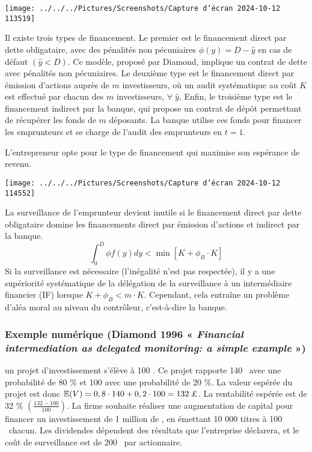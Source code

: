 \documentclass[a4paper, 12pt]{report}
\begin{document}
\texttt{[image: ../../../Pictures/Screenshots/Capture d'écran 2024-10-12 113519]}

Il existe trois types de financement. Le premier est le financement direct par dette obligataire, avec des pénalités non pécuniaires $\phi(y)=D-\widehat{y}$ en cas de défaut $(\widehat{y} < D)$. Ce modèle, proposé par Diamond, implique un contrat de dette avec pénalités non pécuniaires. Le deuxième type est le financement direct par émission d’actions auprès de $m$ investisseurs, où un audit systématique au coût $K$ est effectué par chacun des $m$ investisseurs, $\forall\;\widehat{y}$. Enfin, le troisième type est le financement indirect par la banque, qui propose un contrat de dépôt permettant de récupérer les fonds de $m$ déposants. La banque utilise ces fonds pour financer les emprunteurs et se charge de l’audit des emprunteurs en $t=1$. 

L'entrepreneur opte pour le type de financement qui maximise son espérance de revenu.
\begin{center}
	\texttt{[image: ../../../Pictures/Screenshots/Capture d'écran 2024-10-12 114552]}
\end{center}

La surveillance de l’emprunteur devient inutile si le financement direct par dette obligataire domine les financements direct par émission d’actions et indirect par la banque.
$$
\int_{0}^{D}\phi f(y)dy<\min \left[ K+\phi_B \cdot K\right]
$$
Si la surveillance est nécessaire (l'inégalité n'est pas respectée), il y a une supériorité systématique de la délégation de la surveillance à un intermédiaire financier (IF) lorsque $K+\phi_B < m \cdot K$. Cependant, cela entraîne un problème d’aléa moral au niveau du contrôleur, c'est-à-dire la banque.

\subsubsection{Exemple numérique (Diamond 1996 « \textit{Financial intermediation as delegated monitoring: a simple example} »)}

un projet d'investissement s'élève à 100 \textsterling. Ce projet rapporte 140 \textsterling~avec une probabilité de 80 \% et 100 \textsterling avec une probabilité de 20 \%. La valeur espérée du projet est donc $\mathbb{E}(V) = 0,8 \cdot 140 + 0,2 \cdot 100 = 132 \;\text{\textsterling}$. La rentabilité espérée est de 32 \% $\left( \frac{132 - 100}{100}\right)$. La firme souhaite réaliser une augmentation de capital pour financer un investissement de 1 million de \textsterling, en émettant 10 000 titres à 100 \textsterling~chacun. Les dividendes dépendent des résultats que l’entreprise déclarera, et le coût de surveillance est de 200 \textsterling~par actionnaire.
\end{document}
